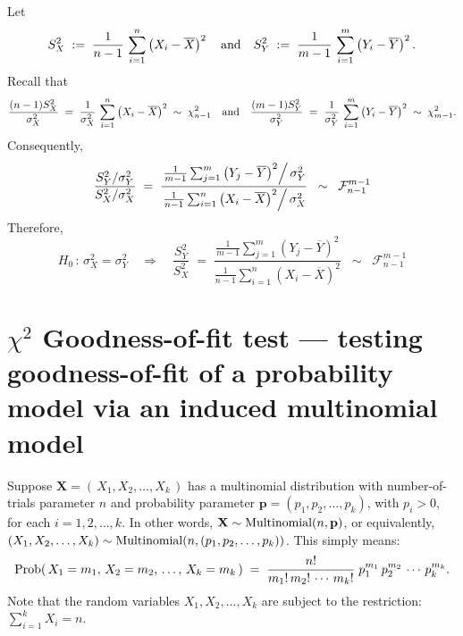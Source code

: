 \documentclass{article}
\begin{document}
Let
\begin{equation*}
    S^{2}_{X} \;:=\; \dfrac{1}{n-1}\,\sum^{n}_{i=1}\left(X_{i}-\overline{X}\right)^{2}
    \quad\textnormal{and}\quad
    S^{2}_{Y} \;:=\; \dfrac{1}{m-1}\,\sum^{m}_{i=1}\left(Y_{i}-\overline{Y}\right)^{2}.
\end{equation*}
Recall that
\begin{equation*}
    \dfrac{(n-1)S^{2}_{X}}{\sigma^{2}_{X}} \;=\; \dfrac{1}{\sigma^{2}_{X}}\,\sum^{n}_{i=1}\left(X_{i}-\overline{X}\right)^{2}\;\sim\;\chi^{2}_{n-1}
    \quad\textnormal{and}\quad
    \dfrac{(m-1)S^{2}_{Y}}{\sigma^{2}_{Y}} \;=\; \dfrac{1}{\sigma^{2}_{Y}}\,\sum^{m}_{i=1}\left(Y_{i}-\overline{Y}\right)^{2}\;\sim\;\chi^{2}_{m-1}.
\end{equation*}
Consequently,
\begin{equation*}
   \dfrac{S^{2}_{Y}/\sigma^{2}_{Y}}{S^{2}_{X}/\sigma^{2}_{X}}
   \;=\;
   \dfrac{\left.\frac{1}{m-1}\sum^{m}_{j=1}\left(Y_{j}-\overline{Y}\right)^{2}\right/\sigma^{2}_{Y}}
            {\left.\frac{1}{n-1}\sum^{n}_{i=1}\left(X_{i}-\overline{X}\right)^{2}\right/\sigma^{2}_{X}}
    \;\;\sim\;\;
    \mathcal{F}^{m-1}_{n-1}
\end{equation*}
Therefore,
\begin{equation*}
   H_{0}\,:\,\sigma^{2}_{X} = \sigma^{2}_{Y}
   \quad\Longrightarrow\quad
   \dfrac{S^{2}_{Y}}{S^{2}_{X}}
   \;=\;\dfrac{\frac{1}{m-1}\sum^{m}_{j=1}\left(Y_{j}-\overline{Y}\right)^{2}}
            {\frac{1}{n-1}\sum^{n}_{i=1}\left(X_{i}-\overline{X}\right)^{2}}
    \;\;\sim\;\;
    \mathcal{F}^{m-1}_{n-1}
\end{equation*}



\section{$\chi^{2}$ Goodness-of-fit test --- testing goodness-of-fit of a probability model via an induced multinomial model}
\setcounter{theorem}{0}

Suppose $\mathbf{X} = \left(\,X_{1},X_{2},\ldots,X_{k}\,\right)$ has a multinomial distribution with number-of-trials parameter $n$ and probability parameter $\mathbf{p} = (p_{1},p_{2},\ldots,p_{k})$, with $p_{i}>0$, for each $i=1,2,\ldots,k$.  In other words, $\mathbf{X} \sim \textnormal{Multinomial}(n,\mathbf{p})$, or equivalently, $(X_{1},X_{2},\ldots,X_{k}) \sim \textnormal{Multinomial}(n,(p_{1},p_{2},\ldots,p_{k}))$.  This simply means:
\begin{equation*}
  \textnormal{Prob}\!\left(\,X_{1}=m_{1},\,X_{2}=m_{2},\,\ldots,\,X_{k}=m_{k}\,\right)
  \; = \;
  \dfrac{n!}{m_{1}!\,m_{2}!\,\cdots\,m_{k}!}\;p_{1}^{m_{1}}\,p_{2}^{m_{2}}\,\cdots\,p_{k}^{m_{k}}.
\end{equation*}
Note that the random variables $X_{1}, X_{2}, \ldots, X_{k}$ are subject to the restriction: $\sum_{i=1}^{k}X_{i} = n$.
\end{document}
